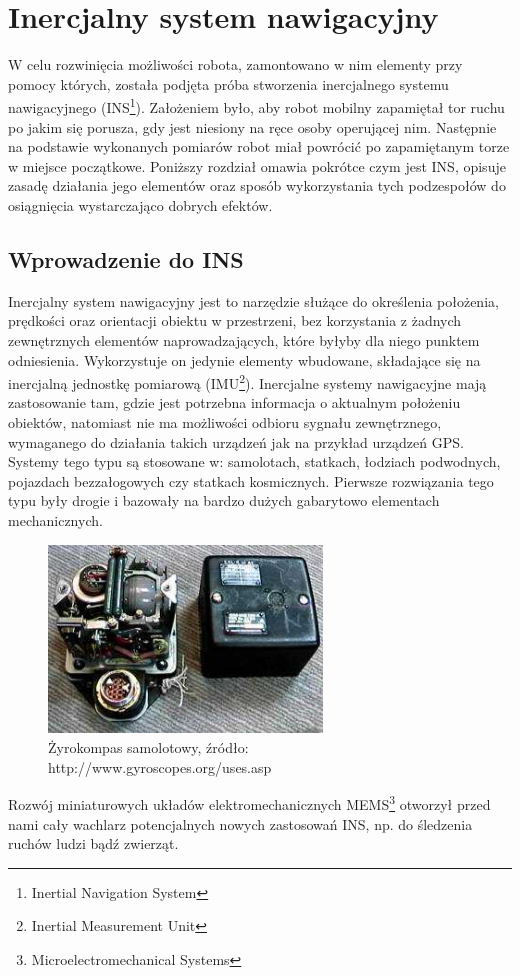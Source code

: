 \section{Inercjalny system nawigacyjny}
W celu rozwinięcia możliwości robota, zamontowano w nim elementy przy pomocy
których, została podjęta próba stworzenia inercjalnego systemu nawigacyjnego
(INS\footnote{Inertial Navigation System}). Założeniem było, aby robot mobilny
zapamiętał tor ruchu po jakim się porusza, gdy jest niesiony na ręce
osoby operującej nim. Następnie na podstawie wykonanych pomiarów robot miał
powrócić po zapamiętanym torze w miejsce początkowe. Poniższy rozdział omawia
pokrótce czym jest INS, opisuje zasadę działania jego elementów oraz sposób
wykorzystania tych podzespołów do osiągnięcia wystarczająco dobrych efektów.

\subsection{Wprowadzenie do INS}

Inercjalny system nawigacyjny jest to narzędzie służące do określenia położenia,
prędkości oraz orientacji obiektu w przestrzeni, bez korzystania z żadnych
zewnętrznych elementów naprowadzających, które byłyby dla niego punktem
odniesienia. Wykorzystuje on jedynie elementy wbudowane, składające się na
inercjalną jednostkę pomiarową (IMU\footnote{Inertial Measurement Unit}).
Inercjalne systemy nawigacyjne mają zastosowanie tam, gdzie jest potrzebna
informacja o aktualnym położeniu obiektów, natomiast nie ma możliwości odbioru
sygnału zewnętrznego, wymaganego do działania takich urządzeń jak na przykład urządzeń GPS. 
Systemy tego typu są stosowane w: samolotach, statkach, łodziach podwodnych, pojazdach
bezzałogowych czy statkach kosmicznych. Pierwsze rozwiązania tego typu były drogie i bazowały na bardzo
dużych gabarytowo elementach mechanicznych. 
\begin{figure}[!ht]
 \centering
 \includegraphics[height=50mm]{../images/ch04/gyrocompass.jpg}
 \caption{Żyrokompas samolotowy, źródło: http://www.gyroscopes.org/uses.asp}
 \label{fig:Zyrokompas}
\end{figure}
Rozwój miniaturowych układów elektromechanicznych MEMS\footnote{Microelectromechanical Systems} otworzył przed nami cały
wachlarz potencjalnych nowych zastosowań INS, np. do śledzenia ruchów ludzi bądź
zwierząt.

